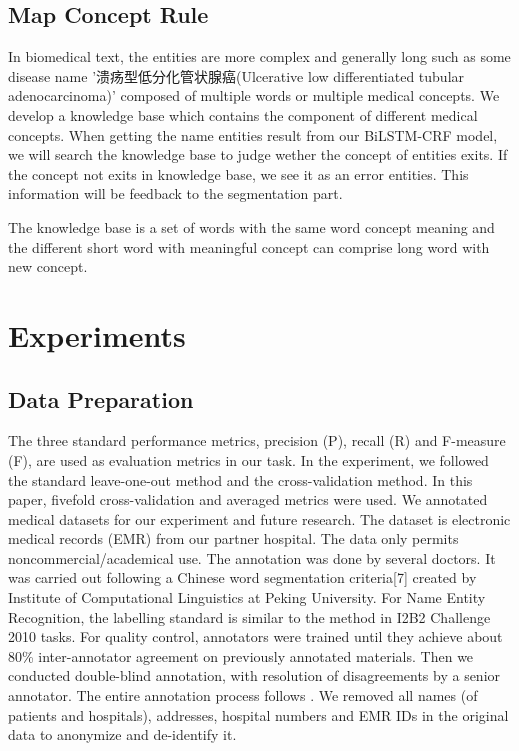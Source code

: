 \documentclass[conference]{IEEEtran}
\begin{document}
\subsection{Map Concept Rule}
In biomedical text, the entities are more complex and generally long such as some disease name '溃疡型低分化管状腺癌(Ulcerative low differentiated tubular adenocarcinoma)' composed of multiple words or multiple medical concepts. We develop a knowledge base which contains the component of different medical concepts. When getting the name entities result from our BiLSTM-CRF model, we will search the knowledge base to judge wether the concept of entities exits. If the concept not exits in knowledge base, we see it as an error entities. This information will be feedback to the segmentation part.

The knowledge base is a set of words with the same word concept meaning and the different short word with meaningful concept can comprise long word with new concept.
\section{Experiments}
\subsection{Data Preparation}
The three standard performance metrics, precision (P), recall (R) and F-measure (F), are used as evaluation metrics in our task.
In the experiment, we followed the standard leave-one-out method and the cross-validation method. In this paper, fivefold cross-validation and averaged metrics were used. 
We annotated medical datasets for our experiment and future research. The  dataset is electronic medical records (EMR) from our partner hospital. The data only permits noncommercial/academical use. The annotation was done by several doctors. It was carried out following a Chinese word segmentation criteria[7] created by Institute of Computational Linguistics at Peking University.  For Name Entity Recognition, the labelling standard is similar to the method in I2B2 Challenge 2010\cite{nn}
tasks. For quality control, annotators were trained until they achieve about 80\% inter-annotator agreement on previously annotated materials. Then we conducted double-blind annotation, with resolution of disagreements by a senior annotator. The entire annotation process follows \cite{nn}. We removed all names (of patients and hospitals), addresses, hospital numbers and EMR IDs in the original data to anonymize and de-identify it.
\end{document}
